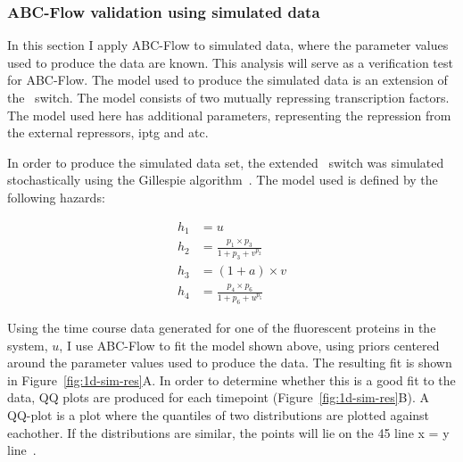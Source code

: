 




\clearpage
\subsubsection{ABC-Flow validation using simulated data}

In this section I apply ABC-Flow to simulated data, where the parameter values used to produce the data are known. This analysis will serve as a verification test for ABC-Flow. The model used to produce the simulated data is an extension of the~\textcite{Gardner:2000vha} switch. The model consists of two mutually repressing transcription factors. The model used here has additional parameters, representing the repression from the external repressors, \acrshort{iptg} and \acrshort{atc}. 

In order to produce the simulated data set, the extended~\textcite{Gardner:2000vha} switch was simulated stochastically using the Gillespie algorithm~\autocite{Gillespie:1977ww}. The model used is defined by the following hazards:

\begin{align}
h_1 &= u \label{eq:eg1}\\
h_2 &= \frac{p_1 \times p_3	}{1+p_3+v^{p_2}} \label{eq:eg2}\\
h_3 &= (1 + a)\times v \label{eq:eg3}\\
h_4 &= \frac{p_4\times p_6}{1+p_6+u^{p_5}} \label{eq:eg4}
\end{align}


Using the time course data generated for one of the fluorescent proteins in the system, $u$, I use ABC-Flow to fit the model shown above, using priors centered around the parameter values used to produce the data. The resulting fit is shown in Figure~\ref{fig:1d-sim-res}A. In order to determine whether this is a good fit to the data, QQ plots are produced for each timepoint (Figure~\ref{fig:1d-sim-res}B). A QQ-plot is a plot where the quantiles of two distributions are plotted against eachother. If the distributions are similar, the points will lie on the 45\textdegree{} line x = y line~\autocite{Wilk:1968ts}. 


